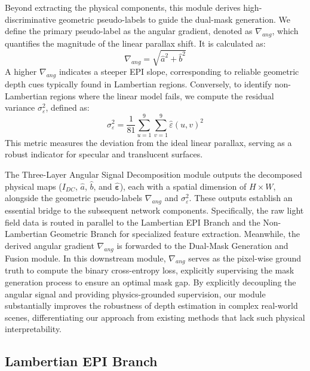 \documentclass[lettersize,journal]{IEEEtran}
\begin{document}
Beyond extracting the physical components, this module derives high-discriminative geometric pseudo-labels to guide the dual-mask generation. We define the primary pseudo-label as the angular gradient, denoted as $\nabla_{ang}$, which quantifies the magnitude of the linear parallax shift. It is calculated as:
\begin{equation}
\nabla_{ang} = \sqrt{\hat{a}^2 + \hat{b}^2}
\label{eq:ch3_6}
\end{equation}
A higher $\nabla_{ang}$ indicates a steeper EPI slope, corresponding to reliable geometric depth cues typically found in Lambertian regions. Conversely, to identify non-Lambertian regions where the linear model fails, we compute the residual variance $\sigma_{\varepsilon}^2$, defined as:
\begin{equation}
\sigma_{\varepsilon}^2 = \frac{1}{81} \sum_{u=1}^{9} \sum_{v=1}^{9} \hat{\varepsilon}(u,v)^2
\label{eq:ch3_7}
\end{equation}
This metric measures the deviation from the ideal linear parallax, serving as a robust indicator for specular and translucent surfaces.

The Three-Layer Angular Signal Decomposition module outputs the decomposed physical maps ($I_{DC}$, $\hat{a}$, $\hat{b}$, and $\hat{\boldsymbol{\varepsilon}}$), each with a spatial dimension of $H \times W$, alongside the geometric pseudo-labels $\nabla_{ang}$ and $\sigma_{\varepsilon}^2$. These outputs establish an essential bridge to the subsequent network components. Specifically, the raw light field data is routed in parallel to the Lambertian EPI Branch and the Non-Lambertian Geometric Branch for specialized feature extraction. Meanwhile, the derived angular gradient $\nabla_{ang}$ is forwarded to the Dual-Mask Generation and Fusion module. In this downstream module, $\nabla_{ang}$ serves as the pixel-wise ground truth to compute the binary cross-entropy loss, explicitly supervising the mask generation process to ensure an optimal mask gap. By explicitly decoupling the angular signal and providing physics-grounded supervision, our module substantially improves the robustness of depth estimation in complex real-world scenes, differentiating our approach from existing methods that lack such physical interpretability.

\subsection{Lambertian EPI Branch}
\end{document}
